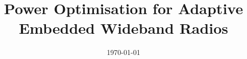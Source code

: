 \documentclass{ecsthesis}                %
\begin{document}
\frontmatter
\title      {Power Optimisation for Adaptive Embedded Wideband Radios}
\addresses  {\groupname\\\deptname\\\univname}
\date       {\today}
\subject    {}
\keywords   {}
\maketitle

	
    
%    
\tableofcontents
\listoffigures
\listoftables
\renewcommand{\arraystretch}{1.5}

\end{document}
